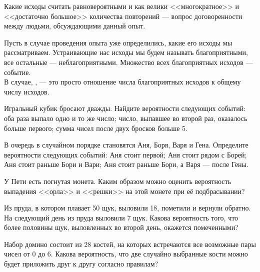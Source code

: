 \documentclass[a4paper,12pt]{article}
\begin{document}
Какие исходы считать равновероятными и как велики <<многократное>> и <<достаточно большое>> количества повторений --- вопрос договоренности между людьми, обсуждающими данный опыт. %

  Пусть в случае проведения опыта уже определились, какие его исходы мы рассматриваем. Устраивающие нас исходы мы будем называть  благоприятными, все остальные ---  неблагоприятными. Множество всех благоприятных исходов ---  событие.\\
  В случае, ,  --- это просто отношение числа благоприятных исходов к общему числу исходов.

  Игральный кубик бросают дважды. Найдите вероятности следующих событий:  оба раза выпало одно и то же число;  число, выпавшее во второй раз, оказалось больше первого;  сумма чисел после двух бросков больше 5.

  В очередь в случайном порядке становятся Аня, Боря, Варя и Гена. Определите вероятности следующих событий:  Аня стоит первой;  Аня стоит рядом с Борей;  Аня стоит раньше Бори и Вари;  Аня стоит раньше Бори, а Варя --- после Гены.

  У Пети есть погнутая монета. Каким образом можно оценить вероятность выпадения <<орла>> и <<решки>> на этой монете при её подбрасывании?


  Из пруда, в котором плавает 50 щук, выловили 18, пометили и вернули обратно. На следующий день из пруда выловили 7 щук. Какова вероятность того, что более половины щук, выловленных во второй день, окажется помеченными?

  Набор домино состоит из 28 костей, на которых встречаются все возможные пары чисел от 0 до 6. Какова вероятность, что две случайно выбранные кости можно будет приложить друг к другу согласно правилам?
\end{document}
